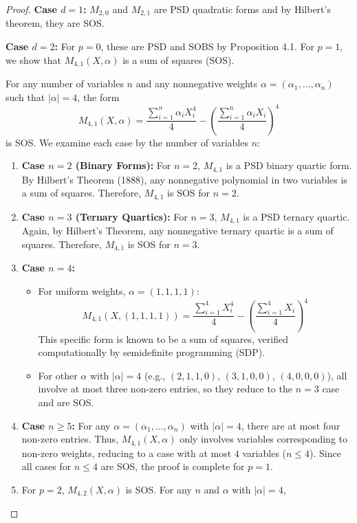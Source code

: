 \documentclass{article}
\begin{document}
\begin{proof}
	\textbf{Case $d=1$:}
$M_{2,0}$ and $M_{2,1}$ are PSD quadratic forms and by Hilbert's theorem, they are SOS.

	\textbf{Case $d=2$:}
For $p=0$, these are PSD and SOBS by Proposition 4.1.
For $p=1$, we show that $M_{4,1}(X, \alpha)$ is a sum of squares (SOS).

For any number of variables $n$ and any nonnegative weights $\alpha = (\alpha_1, \dots, \alpha_n)$ such that $|\alpha| = 4$,
the form
\[
   M_{4,1}(X, \alpha) = \frac{\sum_{i=1}^n \alpha_i X_i^4}{4} - \left( \frac{\sum_{i=1}^n \alpha_i X_i}{4} \right)^4
\]
is SOS. We examine each case by the number of variables $n$:
\begin{enumerate}
   \item \textbf{Case $n=2$ (Binary Forms):} For $n=2$, $M_{4,1}$ is a PSD binary quartic form. By Hilbert's Theorem (1888),
   any nonnegative polynomial in two variables is a sum of squares. Therefore, $M_{4,1}$ is SOS for $n=2$.
   \item \textbf{Case $n=3$ (Ternary Quartics):} For $n=3$, $M_{4,1}$ is a PSD ternary quartic. Again, by Hilbert's Theorem,
   any nonnegative ternary quartic is a sum of squares. Therefore, $M_{4,1}$ is SOS for $n=3$.
   \item \textbf{Case $n=4$:}
      \begin{itemize}
         \item For uniform weights, $\alpha = (1,1,1,1)$:
         \[
            M_{4,1}(X, (1,1,1,1)) = \frac{\sum_{i=1}^4 X_i^4}{4} - \left( \frac{\sum_{i=1}^4 X_i}{4} \right)^4
         \]
         This specific form is known to be a sum of squares, verified computationally by semidefinite programming (SDP).
         \item For other $\alpha$ with $|\alpha|=4$ (e.g., $(2,1,1,0)$, $(3,1,0,0)$, $(4,0,0,0)$), all involve at most
         three non-zero entries, so they reduce to the $n=3$ case and are SOS.
      \end{itemize}
   \item \textbf{Case $n \geq 5$:}
      For any $\alpha = (\alpha_1, \dots, \alpha_n)$ with $|\alpha|=4$, there are at most four non-zero entries. Thus,
      $M_{4,1}(X, \alpha)$ only involves variables corresponding to non-zero weights, reducing to a case with at most $4$
      variables ($n \leq 4$). Since all cases for $n \leq 4$ are SOS, the proof is complete for $p=1$.
   \item For $p=2$, $M_{4,2}(X, \alpha)$ is SOS. For any $n$ and $\alpha$ with $|\alpha|=4$,

\end{enumerate}
\end{proof}
\end{document}
